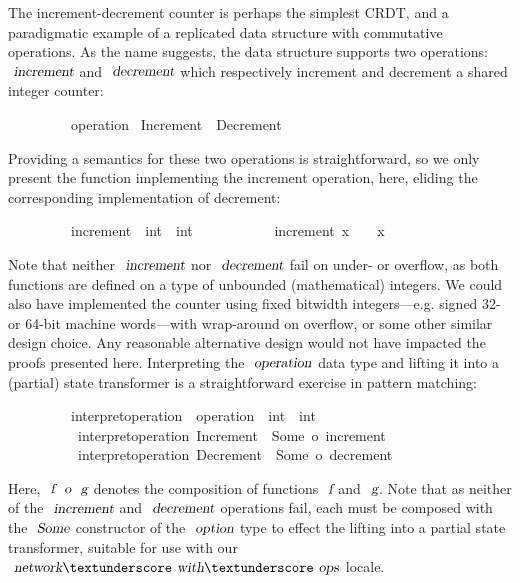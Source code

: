 The increment-decrement counter is perhaps the simplest CRDT, and a paradigmatic example of a replicated data structure with commutative operations.
As the name suggests, the data structure supports two operations: $\isa{increment}$ and $\isa{decrement}$ which respectively increment and decrement a shared integer counter:
\vspace{0.375em}
\begin{isabellebody}
\ \ \ \ \ \ \ \ \ operation {\isacharequal}\ Increment\ {\isacharbar}\ Decrement
\end{isabellebody}
\vspace{0.375em}
Providing a semantics for these two operations is straightforward, so we only present the function implementing the increment operation, here, eliding the corresponding implementation of decrement:
\vspace{0.375em}
\begin{isabellebody}
\ \ \ \ \ \ \ \ \ increment\ {\isacharcolon}{\isacharcolon}\ {\isachardoublequoteopen}int\ {\isasymRightarrow}\ int{\isachardoublequoteclose}\ \isanewline
\ \ \ \ \ \ \ \ \ \ {\isachardoublequoteopen}increment\ x\ {\isasymequiv}\ {}\ {\isacharplus}\ x{\isachardoublequoteclose}
\end{isabellebody}
\vspace{0.375em}
Note that neither $\isa{increment}$ nor $\isa{decrement}$ fail on under- or overflow, as both functions are defined on a type of unbounded (mathematical) integers.
We could also have implemented the counter using fixed bitwidth integers---e.g. signed 32- or 64-bit machine words---with wrap-around on overflow, or some other similar design choice.
Any reasonable alternative design would not have impacted the proofs presented here.
Interpreting the $\isa{operation}$ data type and lifting it into a (partial) state transformer is a straightforward exercise in pattern matching:
\vspace{0.375em}
\begin{isabellebody}
\ \ \ \ \ \ \ \ \ interpret{\isacharunderscore}operation\ {\isacharcolon}{\isacharcolon}\ {\isachardoublequoteopen}operation\ {\isasymRightarrow}\ int\ {\isasymrightharpoonup}\ int{\isachardoublequoteclose}\ \isanewline
\ \ \ \ \ \ \ \ \ \ {\isachardoublequoteopen}interpret{\isacharunderscore}operation\ Increment\ {\isacharequal}\ Some\ o\ increment{\isachardoublequoteclose}\ {\isacharbar}\isanewline
\ \ \ \ \ \ \ \ \ \ {\isachardoublequoteopen}interpret{\isacharunderscore}operation\ Decrement\ {\isacharequal}\ Some\ o\ decrement{\isachardoublequoteclose}
\end{isabellebody}
\vspace{0.375em}
Here, $\isa{f}\ \isa{o}\ \isa{g}$ denotes the composition of functions $\isa{f}$ and $\isa{g}$.
Note that as neither of the $\isa{increment}$ and $\isa{decrement}$ operations fail, each must be composed with the $\isa{Some}$ constructor of the $\isa{option}$ type to effect the lifting into a partial state transformer, suitable for use with our $\isa{network}{\isacharunderscore}\isa{with}{\isacharunderscore}\isa{ops}$ locale.

